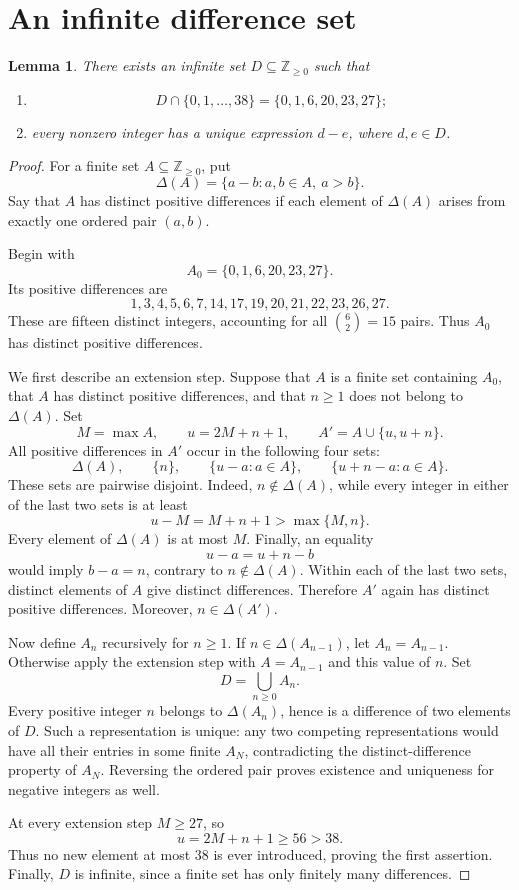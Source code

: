 \documentclass[11pt]{article}
\newcommand{\ZZ}{\mathbb{Z}}
\newtheorem{lemma}[theorem]{Lemma}
\begin{document}
\section{An infinite difference set}

\begin{lemma}\label{lem:difference-set}
There exists an infinite set \(D\subseteq\ZZ_{\geq 0}\) such that
\begin{enumerate}
    \item
    \[
        D\cap\{0,1,\ldots,38\}=\{0,1,6,20,23,27\};
    \]
    \item every nonzero integer has a unique expression \(d-e\), where
    \(d,e\in D\).
\end{enumerate}
\end{lemma}

\begin{proof}
For a finite set \(A\subseteq\ZZ_{\geq 0}\), put
\[
    \Delta(A)=\{a-b:a,b\in A,\ a>b\}.
\]
Say that \(A\) has distinct positive differences if each element of
\(\Delta(A)\) arises from exactly one ordered pair \((a,b)\).

Begin with
\[
    A_0=\{0,1,6,20,23,27\}.
\]
Its positive differences are
\[
    1,3,4,5,6,7,14,17,19,20,21,22,23,26,27.
\]
These are fifteen distinct integers, accounting for all
\(\binom{6}{2}=15\) pairs. Thus \(A_0\) has distinct positive differences.

We first describe an extension step. Suppose that \(A\) is a finite set
containing \(A_0\), that \(A\) has distinct positive differences, and that
\(n\geq 1\) does not belong to \(\Delta(A)\). Set
\[
    M=\max A,\qquad u=2M+n+1,
    \qquad A'=A\cup\{u,u+n\}.
\]
All positive differences in \(A'\) occur in the following four sets:
\[
    \Delta(A),\qquad
    \{n\},\qquad
    \{u-a:a\in A\},\qquad
    \{u+n-a:a\in A\}.
\]
These sets are pairwise disjoint. Indeed, \(n\notin\Delta(A)\), while every
integer in either of the last two sets is at least
\[
    u-M=M+n+1>\max\{M,n\}.
\]
Every element of \(\Delta(A)\) is at most \(M\). Finally, an equality
\[
    u-a=u+n-b
\]
would imply \(b-a=n\), contrary to \(n\notin\Delta(A)\).
Within each of the last two sets, distinct elements of \(A\) give distinct
differences. Therefore \(A'\) again has distinct positive differences.
Moreover, \(n\in\Delta(A')\).

Now define \(A_n\) recursively for \(n\geq 1\). If
\(n\in\Delta(A_{n-1})\), let \(A_n=A_{n-1}\). Otherwise apply the extension
step with \(A=A_{n-1}\) and this value of \(n\). Set
\[
    D=\bigcup_{n\geq 0}A_n.
\]
Every positive integer \(n\) belongs to \(\Delta(A_n)\), hence is a
difference of two elements of \(D\). Such a representation is unique:
any two competing representations would have all their entries in some
finite \(A_N\), contradicting the distinct-difference property of \(A_N\).
Reversing the ordered pair proves existence and uniqueness for negative
integers as well.

At every extension step \(M\geq 27\), so
\[
    u=2M+n+1\geq 56>38.
\]
Thus no new element at most \(38\) is ever introduced, proving the first
assertion. Finally, \(D\) is infinite, since a finite set has only finitely
many differences.
\end{proof}
\end{document}
